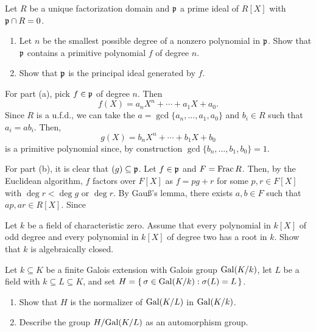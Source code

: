 \begin{problem}
  Let \(R\) be a unique factorization domain and \(\mathfrak{p}\) a prime ideal
  of \(R[X]\) with \(\mathfrak{p}\cap R=0\).
  \begin{enumerate}[label=(\alph*)]
  \item Let \(n\) be the smallest possible degree of a nonzero polynomial
    in \(\mathfrak{p}\). Show that \(\mathfrak{p}\) contains a primitive polynomial
    \(f\) of degree \(n\).
  \item Show that \(\mathfrak{p}\) is the principal ideal generated by \(f\).
  \end{enumerate}
\end{problem}
\begin{solution}
  For part (a), pick \(f\in\mathfrak{p}\) of degree \(n\). Then
  \[
    f(X)=a_nX^n+\dotsb+a_1X+a_0.
  \]
  Since \(R\) is a u.f.d.\@, we can take the
  \(a=\gcd\{a_n,\dotsc,a_1,a_0\}\) and \(b_i\in R\) such that
  \(a_i=ab_i\). Then,
  \[
    g(X)=b_nX^n+\dotsb+b_1X+b_0
  \]
  is a primitive polynomial since, by construction
  \(\gcd\{b_n,\dotsc,b_1,b_0\}=1\).

  For part (b), it is clear that \((g)\subseteq\mathfrak{p}\). Let \(f\in\mathfrak{p}\)
  and \(F=\operatorname{Frac} R\). Then, by the Euclidean algorithm, \(f\) factors over
  \(F[X]\) as \(f=pg+r\) for some \(p,r\in F[X]\) with \(\deg r<\deg g\) or
  \(\deg r\). By Gauß's lemma, there exists \(a,b\in F\) such that
  \(ap,ar\in R[X]\). Since
\end{solution}

\begin{problem}
  Let \(k\) be a field of characteristic zero. Assume that every polynomial
  in \(k[X]\) of odd degree and every polynomial in \(k[X]\) of degree two
  has a root in \(k\). Show that \(k\) is algebraically closed.
\end{problem}
\begin{solution}
\end{solution}

\begin{problem}
  Let \(k\subseteq K\) be a finite Galois extension with Galois group
  \(\operatorname{Gal}(K/k)\), let \(L\) be a field with \( k\subseteq L\subseteq K\),
  and set \(H=\left\{\,\sigma\in\operatorname{Gal}(K/k):\sigma(L)=L\,\right\}\).
  \begin{enumerate}[label=(\alph*)]
  \item Show that \(H\) is the normalizer of \(\operatorname{Gal}(K/L)\) in
    \(\operatorname{Gal}(K/k)\).
  \item Describe the group \(H/{\operatorname{Gal}(K/L)}\) as an automorphism group.
  \end{enumerate}
\end{problem}
\begin{solution}
\end{solution}

